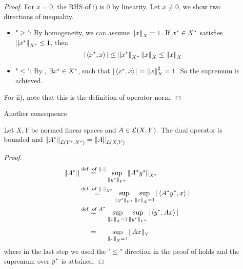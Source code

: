 \documentclass{article}
\begin{document}
\begin{proof}
For $x=0$, the RHS of i) is $0$ by linearity. Let $x \neq 0$, we show two directions of inequality.  
\begin{itemize}
    \item "$\geq$": By homogeneity, we can assume $\left\|{x}\right\|_X=1$. If ${x}^* \in {X}^*$ satisfies $\left\|{x^*}\right\|_{{X}^*} \leq 1$, then  
    $$|\left<{{x}^*},{x}\right>| \leq \left\|{x^*}\right\|_{{X}^*} \left\|{x}\right\|_X \leq \left\|{x}\right\|_X$$
    \item "$\leq$": By , $\exists {x}^* \in {X}^*$, such that $|\left<{{x}^*},{x}\right>|=\left\|{x}\right\|_X^2=1$. So the supremum is achieved.
\end{itemize}   

For ii), note that this is the definition of operator norm.   
\end{proof}

Another consequence \placeholder

\begin{theorem}
Let $X,Y$ be normed linear spaces and $A \in \mathcal{L}({X},{Y})$. The dual operator  is bounded and $\left\|{{A}^*}\right\|_{\mathcal{L}({{Y}^*},{{X}^*})}=\left\|{A}\right\|_{\mathcal{L}({X},{Y})}$
\end{theorem}  

\begin{proof}
\begin{align*}
    \norm{\dual{A}} &\stackrel{\textrm{def \ of} \ \norm{\cdot}}{=} \sup_{\norm{\dual{y}}_{\dual{Y}}} \norm{\dual{A} \dual{y}}_{\dual{X}} \\
    &\stackrel{\textrm{def \ of} \  \norm{\cdot}_{\dual{X}}}{=} \sup_{\norm{\dual{y}}_{\dual{Y}}} \sup_{\norm{x}_X=1} |\inne{\dual{A}\dual{y}}{x}| \\
    &\stackrel{\textrm{def \ of} \ \dual{A}}{=} \sup_{\norm{x}_X=1}  \sup_{\norm{\dual{y}}_{\dual{Y}}}  |\inne{\dual{y}}{Ax}| \\
    &\stackrel{\phantom{\textrm{def \ of} \ \dual{A}}}{=} \sup_{\norm{x}_X=1} \norm{Ax}_Y
\end{align*}
where in the last step we used the "$\leq$" direction in the proof of  holds and the supremum over ${y}^*$ is attained.  
\end{proof}
\end{document}
